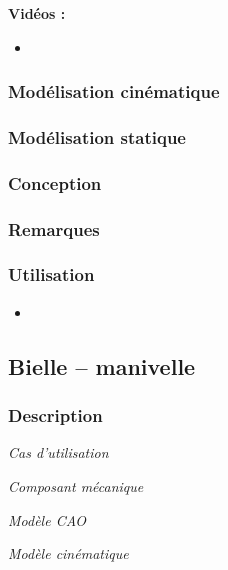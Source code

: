\documentclass[11pt,oneside]{article}
\begin{document}
\textbf{Vidéos :}
\begin{itemize}
\item
\end{itemize}

\subsubsection{Modélisation cinématique}
\subsubsection{Modélisation statique}
\subsubsection{Conception}
\subsubsection{Remarques}
\subsubsection{Utilisation}
\begin{itemize}
\item
\end{itemize}
\newpage

\subsection{Bielle -- manivelle}
\subsubsection{Description}

\begin{center}
\hfill
\begin{minipage}[c]{.21\linewidth}
\begin{center}
\textit{Cas d'utilisation}
\end{center}
\end{minipage} \hfill
\begin{minipage}[c]{.21\linewidth}
\begin{center}
\textit{Composant mécanique}
\end{center}
\end{minipage} \hfill
\begin{minipage}[c]{.21\linewidth}
\begin{center}
\textit{Modèle CAO}
\end{center} 
\end{minipage}\hfill
\begin{minipage}[c]{.21\linewidth}
\begin{center}
\textit{Modèle cinématique}
\end{center} 
\end{minipage}\hfill
\end{center}
\end{document}
